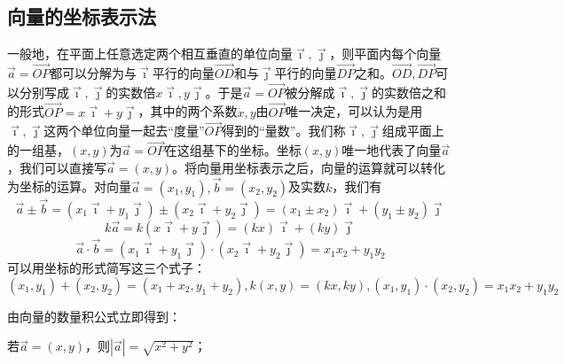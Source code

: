 \subsection{向量的坐标表示法}
一般地，在平面上任意选定两个相互垂直的单位向量\(\vec{\imath} , \vec{\jmath}\)，则平面内每个向量\(\vec{a} = \vec{O P}\)都可以分解为与\(\vec{\imath}\)平行的向量\(\vec{O D}\)和与\(\vec{\jmath}\)平行的向量\(\vec{D P}\)之和。\(\vec{O D} , \vec{D P}\)可以分别写成\(\vec{\imath} , \vec{\jmath}\)的实数倍\(x \vec{\imath} , y \vec{\jmath}\)。于是\(\vec{a} = \vec{O P}\)被分解成\(\vec{\imath} , \vec{\jmath}\)的实数倍之和的形式\(\vec{O P} = x \vec{\imath} + y \vec{\jmath}\)，其中的两个系数\(x , y\)由\(\vec{O P}\)唯一决定，可以认为是用\(\vec{\imath} , \vec{\jmath}\)这两个单位向量一起去“度量”\(\vec{O P}\)得到的“量数”。我们称\(\vec{\imath} , \vec{\jmath}\)组成平面上的一组基，\(\left( x , y \right)\)为\(\vec{a} = \vec{O P}\)在这组基下的坐标。坐标\(\left( x , y \right)\)唯一地代表了向量\(\vec{a}\)，我们可以直接写\(\vec{a} = \left( x , y \right)\)。将向量用坐标表示之后，向量的运算就可以转化为坐标的运算。对向量\(\vec{a} = \left( x_{1} , y_{1} \right) , \vec{b} = \left( x_{2} , y_{2} \right)\)及实数\(k\)，我们有
\begin{equation}
    \vec{a} \pm \vec{b} = \left( x_{1} \vec{\imath} + y_{1} \vec{\jmath} \right) \pm \left( x_{2} \vec{\imath} + y_{2} \vec{\jmath} \right) = \left( x_{1} \pm x_{2} \right) \vec{\imath} + \left( y_{1} \pm y_{2} \right) \vec{\jmath}
\end{equation}
\begin{equation}
    k \vec{a} = k \left( x \vec{\imath} + y \vec{\jmath} \right) = \left( k x \right) \vec{\imath} + \left( k y \right) \vec{\jmath}
\end{equation}
\begin{equation}
    \vec{a} \cdot \vec{b} = \left( x_{1} \vec{\imath} + y_{1} \vec{\jmath} \right) \cdot \left( x_{2} \vec{\imath} + y_{2} \vec{\jmath} \right) = x_{1} x_{2} + y_{1} y_{2}
\end{equation}
可以用坐标的形式简写这三个式子：
\begin{equation}
    \left( x_{1} , y_{1} \right) + \left( x_{2} , y_{2} \right) = \left( x_{1} + x_{2} , y_{1} + y_{2} \right) , k \left( x , y \right) = \left( k x , k y \right) , \left( x_{1} , y_{1} \right) \cdot \left( x_{2} , y_{2} \right) = x_{1} x_{2} + y_{1} y_{2}
\end{equation}

由向量的数量积公式立即得到：

若\(\vec{a} = \left( x , y \right)\)，则\(\left| \vec{a} \right| = \sqrt{x^{2} + y^{2}}\)；

